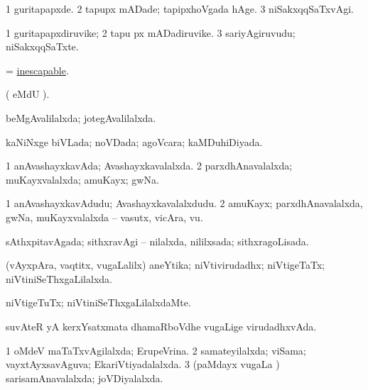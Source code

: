 \bentry
{} 
\gl{\kirxvi}
\expl{}
\bmng
\bnum
\num{1} guritapapxde. 
\num{2} tapupx mADade; tapipxhoVgada hAge. 
\num{3} niSakxqqSaTxvAgi. 
\enum
\emng
\eentry

\bentry
{} 
\gl{\nA}
\expl{}
\bmng
\bnum
\num{1} guritapapxdiruvike; 
\num{2} tapu px mADadiruvike. 
\num{3} sariyAgiruvudu; niSakxqqSaTxte. 
\enum
\emng
\eentry

\bentry
{} 
\gl{\gu}
\expl{}
\bmng
 = \hyperref{kandict_i.pdf}{I}{inescapable}{inescapable}. 
\emng
\eentry

\bentry
{} 
\gl{\saMkiSx}
\expl{}
\bmng
( eMdU \parx).  
\emng
\eentry

\bentry
{} 
\gl{\gu}
\expl{}
\bmng
 beMgAvalilalxda; jotegAvalilalxda. 
\emng
\eentry

\bentry
{} 
\gl{\gu}
\expl{}
\bmng
 kaNiNxge biVLada; noVDada; agoVcara; kaMDuhiDiyada. 
\emng
\eentry

\bentry
{} 
\gl{\gu}
\expl{}
\bmng
\bnum
\num{1} anAvashayxkavAda; Avashayxkavalalxda. 
\num{2} parxdhAnavalalxda; muKayxvalalxda; amuKayx; gwNa. 
\enum
\emng
\eentry

\bentry
{} 
\gl{\nA}
\expl{}
\bmng
\bnum
\num{1} anAvashayxkavAdudu; Avashayxkavalalxdudu. 
\num{2} amuKayx; parxdhAnavalalxda, gwNa, muKayxvalalxda -- vasutx, vicAra, \mo vu. 
\enum
\emng
\eentry

\bentry
{} 
\gl{\gu}
\expl{}
\bmng
 sAthxpitavAgada; sithxravAgi -- nilalxda, nililxsada; sithxragoLisada. 
\emng
\eentry

\bentry
{} 
\gl{\gu}
\expl{}
\bmng
 (vAyxpAra, vaqtitx, \mo vugaLalilx) aneYtika; niVtivirudadhx; niVtigeTaTx; niVtiniSeThxgaLilalxda. 
\emng
\eentry

\bentry
{} 
\gl{\kirxvi}
\expl{}
\bmng
 niVtigeTuTx; niVtiniSeThxgaLilalxdaMte. 
\emng
\eentry

\bentry
{} 
\gl{\gu}
\expl{}
\bmng
 suvAteR yA kerxYsatxmata dhamaRboVdhe \mo vugaLige virudadhxvAda. 
\emng
\eentry

\bentry
{} 
\gl{\gu}
\expl{}
\bmng
\bnum
\num{1} oMdeV maTaTxvAgilalxda; ErupeVrina. 
\num{2} samateyilalxda; viSama; vayxtAyxsavAguva; EkariVtiyadalalxda. 
\num{3} (paMdayx \mo vugaLa \vi) sarisamAnavalalxda; joVDiyalalxda. 
\enum
\emng
\eentry

